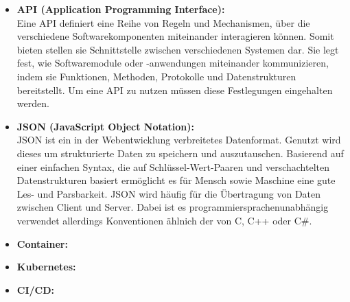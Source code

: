 \begin{itemize}
    \item \textbf{API (Application Programming Interface):} \\
    Eine API definiert eine Reihe von Regeln und Mechanismen, über die verschiedene Softwarekomponenten miteinander interagieren können.
    Somit bieten stellen sie Schnittstelle zwischen verschiedenen Systemen dar.
    Sie legt fest, wie Softwaremodule oder -anwendungen miteinander kommunizieren, indem sie Funktionen, Methoden, Protokolle und Datenstrukturen bereitstellt.
    Um eine API zu nutzen müssen diese Festlegungen eingehalten werden.
    
    
    \item \textbf{JSON (JavaScript Object Notation):} \\
    JSON ist ein in der Webentwicklung verbreitetes Datenformat.
    Genutzt wird dieses um strukturierte Daten zu speichern und auszutauschen.
    Basierend auf einer einfachen Syntax, die auf Schlüssel-Wert-Paaren und verschachtelten Datenstrukturen basiert ermöglicht es für Mensch sowie Maschine eine gute Les- und Parsbarkeit.
    JSON wird häufig für die Übertragung von Daten zwischen Client und Server.
    Dabei ist es programmiersprachenunabhängig verwendet allerdings Konventionen ählnich der von C, C++ oder C\#.

    \item \textbf{Container:} \\
    \item \textbf{Kubernetes:} \\
    \item \textbf{CI/CD:} \\
\end{itemize}
